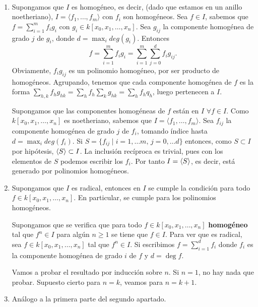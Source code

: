 \documentclass[twoside]{article}
\begin{document}
\begin{solucion}\
\begin{enumerate}
\item Supongamos que $I$ es homogéneo, es decir, (dado que estamos en un anillo noetheriano), $I=\langle f_1,\dots, f_m\rangle$ con $f_i$ son homogéneos. Sea $f\in I$, sabemos que $f=\sum_{i=1}^mf_ig_i$ con $g_i\in k[x_0,x_1,\dots,x_n]$. Sea $g_{ij}$ la componente homogénea de grado $j$ de $g_i$, donde $d=\max_{i} deg(g_i)$. Entonces
$$f=\sum_{i=1}^m f_i g_i= \sum_{i=1}^m\sum_{j=0}^d f_ig_{ij}.$$
Obviamente, $f_i g_{ij}$ es un polinomio homogéneo, por ser producto de homogéneos. Agrupando, tenemos que cada componente homogénea de $f$ es la forma $ \sum_{h,k} f_hg_{hk} = \sum_{h}f_h\sum_{k} g_{hk}= \sum_{h}f_h q_h$, luego pertenecen a $I$.

 Supongamos que las componentes homogéneas de $f$ están en $I$ $\forall f \in I$. Como $k[x_0,x_1,\dotsc,x_n]$ es noetheriano, sabemos que $I=\langle f_1,\dots, f_m\rangle$. Sea $f_{ij}$ la componente homogénea de grado $j$ de $f_i$, tomando índice hasta $d=\max_{i} deg(f_i)$. Si $S=\{f_{ij} \mid i=1,\dotsc m,\,j=0,\dotsc d\}$ entonces, como $S\subset I$ por hipótesis, $\langle{S}\rangle \subset I$. La inclusión recíproca es trivial, pues con los elementos de $S$ podemos escribir los $f_i$. Por tanto $I=\langle{S}\rangle$, es decir, está generado por polinomios homogéneos.

\item Supongamos que $I$ es radical, entonces en $I$ se cumple la condición para todo $f\in k[x_0,x_1,\dots,x_n]$. En particular, se cumple para los polinomios homogéneos.

Supongamos que se verifica que para todo $f \in k[x_0, x_1,\dots, x_n]$ \textbf{homogéneo} tal que $f^n \in I$ para algún $n \geq 1$ se tiene que $f \in I$. Para ver que es radical, sea $f \in k[x_0, x_1,\dots, x_n]$ tal que $f^n \in I$. Si escribimos $f = \sum_{i=1}^d f_i$ donde $f_i$ es la componente homogénea de grado $i$ de $f$ y $d=\deg{f}$.

Vamos a probar el resultado por inducción sobre $n$. Si $n=1$, no hay nada que probar. Supuesto cierto para $n=k$, veamos para $n=k+1$.

\item Análogo a la primera parte del segundo apartado.


\end{enumerate}

\end{solucion}
\end{document}
